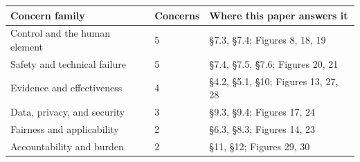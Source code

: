 \noindent\begin{tabularx}{\textwidth}{L{4.2cm} C{1.9cm} Y}
\toprule
\textbf{Concern family} & \textbf{Concerns} & \textbf{Where this paper answers it} \\
\midrule
Control and the human element & 5 & \S7.3, \S7.4; Figures 8, 18, 19 \\
Safety and technical failure & 5 & \S7.4, \S7.5, \S7.6; Figures 20, 21 \\
Evidence and effectiveness & 4 & \S4.2, \S5.1, \S10; Figures 13, 27, 28 \\
Data, privacy, and security & 3 & \S9.3, \S9.4; Figures 17, 24 \\
Fairness and applicability & 2 & \S6.3, \S8.3; Figures 14, 23 \\
Accountability and burden & 2 & \S11, \S12; Figures 29, 30 \\
\bottomrule
\end{tabularx}

\vspace{0.30em}

